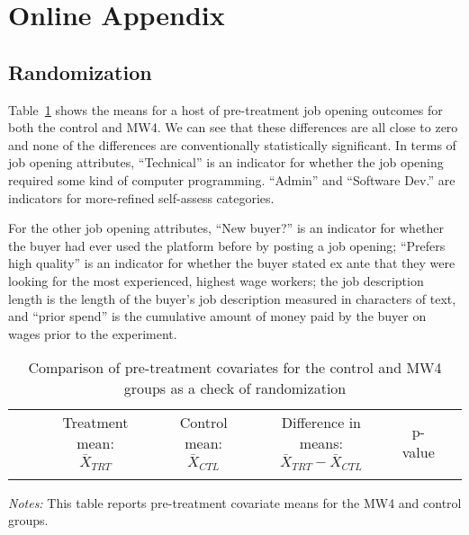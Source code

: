 \documentclass[AER]{AEA}
\begin{document}
\clearpage




\clearpage 

\newpage

\appendix

\section{Online Appendix} \label{sec:iv} 

\subsection{Randomization} \label{sec:randomization} 

Table~\ref{tab:randomization_check} shows the means for a host of pre-treatment job opening outcomes for both the control and MW4.
We can see that these differences are all close to zero and none of the differences are conventionally statistically significant. 
In terms of job opening attributes, ``Technical'' is an indicator for whether the job opening required some kind of computer programming.
``Admin'' and ``Software Dev.'' are indicators for more-refined self-assess categories.

For the other job opening attributes, ``New buyer?'' is an indicator for whether the buyer had ever used the platform before by posting a job opening; ``Prefers high quality'' is an indicator for whether the buyer stated ex ante that they were looking for the most experienced, highest wage workers; the job description length is the length of the buyer's job description measured in characters of text, and ``prior spend'' is the cumulative amount of money paid by the buyer on wages prior to the experiment.   

\begin{table}
\begin{center}
\caption{Comparison of pre-treatment covariates for the control and MW4 groups as a check of randomization \label{tab:randomization_check}}
\begin{small}
\begin{tabular}{lllcccc}
\toprule
& & \multicolumn{1}{c}{\parbox[t][][t]{2cm}{Treatment mean:\\ $\bar{X}_{TRT}$}}
& \multicolumn{1}{c}{\parbox[t][][t]{2cm}{Control mean:\\ $\bar{X}_{CTL}$}}
& \multicolumn{1}{c}{\parbox[t][][t]{2cm}{Difference in means: \\ $\bar{X}_{TRT} - \bar{X}_{CTL}$}}
& \multicolumn{1}{c}{\parbox[b][][b]{2cm}{ p-value }} \\
\\
\hline
  
 \end{tabular}
\end{small}
\end{center}
\singlespace
\begin{footnotesize}
  \emph{Notes:} This table reports pre-treatment covariate means for the MW4 and control groups. 
\end{footnotesize}
\end{table}
\end{document}
